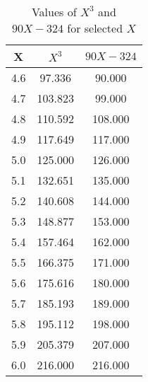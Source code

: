 ﻿%
\begin{table}[h!]
    \centering
    \caption{Values of $X^3$ and $90X - 324$ for selected $X$}
    \begin{tabular}{|c|c|c|}
        \hline
        \textbf{X} & \textbf{$X^3$} & \textbf{$90X - 324$} \\ \hline
        4.6        & 97.336         & 90.000               \\ \hline
        4.7        & 103.823        & 99.000               \\ \hline
        4.8        & 110.592        & 108.000              \\ \hline
        4.9        & 117.649        & 117.000              \\ \hline
        5.0        & 125.000        & 126.000              \\ \hline
        5.1        & 132.651        & 135.000              \\ \hline
        5.2        & 140.608        & 144.000              \\ \hline
        5.3        & 148.877        & 153.000              \\ \hline
        5.4        & 157.464        & 162.000              \\ \hline
        5.5        & 166.375        & 171.000              \\ \hline
        5.6        & 175.616        & 180.000              \\ \hline
        5.7        & 185.193        & 189.000              \\ \hline
        5.8        & 195.112        & 198.000              \\ \hline
        5.9        & 205.379        & 207.000              \\ \hline
        6.0        & 216.000        & 216.000              \\ \hline

\end{tabular}
\end{table}
